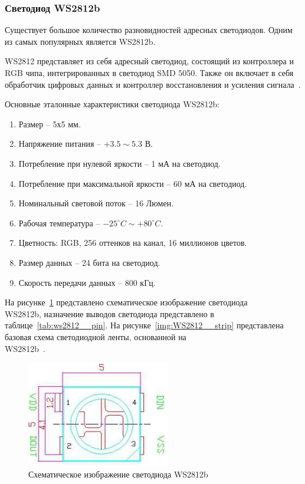 \subsubsection{Светодиод WS2812b}

Существует большое количество разновидностей адресных светодиодов. Одним из самых популярных является WS2812b.

WS2812 представляет из себя адресный светодиод, состоящий из контроллера и RGB чипа, интегрированных в светодиод SMD 5050. Также он включает в себя обработчик цифровых данных и контроллер восстановления и усиления сигнала~\cite{Worldseim}.

Основные эталонные характеристики светодиода WS2812b:

\begin{enumerate}
  \item Размер -- 5х5 мм.
  \item Напряжение питания -- $+3.5 \sim 5.3$ В.
  \item Потребление при нулевой яркости -- 1 мА на светодиод.
  \item Потребление при максимальной яркости -- 60 мА на светодиод.
  \item Номинальный световой поток -- 16 Люмен.
  \item Рабочая температура -- $-25^\circ C \sim +80^\circ C$.
  \item Цветность: RGB, 256 оттенков на канал, 16 миллионов цветов.
  \item Размер данных -- 24 бита на светодиод.
  \item Скорость передачи данных -- 800 кГц.
\end{enumerate}

На рисунке~\ref{img:WS2812__schema} представлено схематическое изображение светодиода\\WS2812b, назначение выводов светодиода представлено в таблице~\ref{tab:ws2812__pin}. На рисунке~\ref{img:WS2812__strip} представлена базовая схема светодиодной ленты, основанной на\\WS2812b~\cite{Worldseim}.

\begin{figure}[H]
  \centering
  \includegraphics[height=0.2\textheight]{assets/images/theoretical/Схема светодиода.png}
  \caption{Схематическое изображение светодиода WS2812b}
  \label{img:WS2812__schema}
\end{figure}

